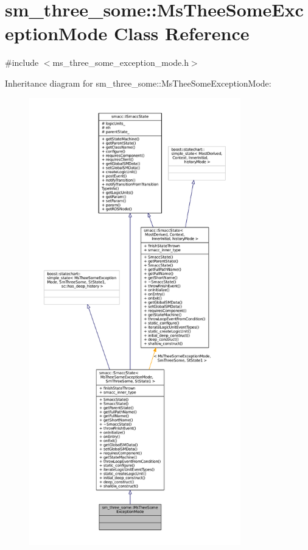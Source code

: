 \hypertarget{classsm__three__some_1_1MsTheeSomeExceptionMode}{}\section{sm\+\_\+three\+\_\+some\+:\+:Ms\+Thee\+Some\+Exception\+Mode Class Reference}
\label{classsm__three__some_1_1MsTheeSomeExceptionMode}


{\ttfamily \#include $<$ms\+\_\+three\+\_\+some\+\_\+exception\+\_\+mode.\+h$>$}



Inheritance diagram for sm\+\_\+three\+\_\+some\+:\+:Ms\+Thee\+Some\+Exception\+Mode\+:
\nopagebreak
\begin{figure}[H]
\begin{center}
\leavevmode
\includegraphics[height=550pt]{classsm__three__some_1_1MsTheeSomeExceptionMode__inherit__graph}
\end{center}
\end{figure}


